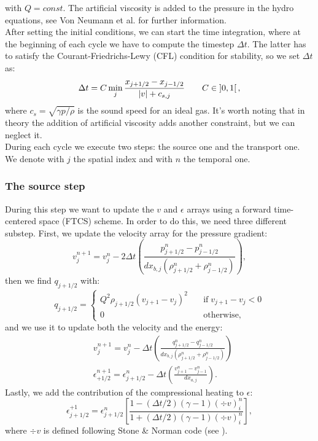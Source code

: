 \documentclass{article}
\begin{document}
with $Q=const$. The artificial viscosity is added to the pressure in the hydro equations, see Von Neumann et al.\cite{vonneuman} for further information.\\
After setting the initial conditions, we can start the time integration, where at the beginning of each cycle we have to compute the timestep $\Delta t$. The latter has to satisfy the Courant-Friedrichs-Lewy (CFL) condition for stability, so we set $\Delta t$ as:
\begin{equation}\label{timeeq}
	\Delta t=C\min_{j}{\frac{x_{j+1/2}-x_{j-1/2}}{\abs{v}+c_{s,j}}} \qquad C\in \left]0,1\right[,
\end{equation}
where $c_s=\sqrt{\gamma p/\rho}$ is the sound speed for an ideal gas. It's worth noting that in theory the addition of artificial viscosity adds another constraint, but we can neglect it. \\
During each cycle we execute two steps: the source one and the transport one. We denote with $j$ the spatial index and with $n$ the temporal one.
\subsubsection{The source step}
During this step we want to update the $v$ and $\epsilon$ arrays using a forward time-centered space (FTCS) scheme. In order to do this, we need three different substep. First, we update the velocity array for the pressure gradient:
\begin{equation}
	v_{j}^{n+1}=v_{j}^n-2\Delta t\left(\frac{p_{j+1/2}^n-p_{j-1/2}^n}{dx_{b,j}(\rho_{j+1/2}^n+\rho_{j-1/2}^n)}\right),
\end{equation}
then we find $q_{j+1/2}$ with:
\begin{equation}
	q_{j+1/2}=
	\begin{cases}
		Q^{2}\rho_{j+1/2}(v_{j+1}-v_j)^2 \quad &\text{if} \; v_{j+1}-v_j<0\\
		0 \quad &\text{otherwise},
	\end{cases}
\end{equation}
and we use it to update both the velocity and the energy:
\begin{align}
	&v_j^{n+1}=v_j^n-\Delta t\left(\frac{q_{j+1/2}^n-q_{j-1/2}^n}{dx_{b,j}(\rho_{j+1/2}^n+\rho_{j-1/2}^n)}\right)\\
	&\epsilon_{+1/2}^{n+1}=\epsilon_{j+1/2}^n-\Delta t\left(\frac{v_{j+1}^n-v_{j-1}^n}{dx_{a,j}}\right).
\end{align}
Lastly, we add the contribution of the compressional heating to $\epsilon$:
\begin{equation}
	\epsilon^{+1}_{j+1/2}=\epsilon^n_{j+1/2}\left[\frac{1-(\Delta t/2)(\gamma -1)(\div{v})_i^n}{1+(\Delta t/2)(\gamma -1)(\div{v})_i^n}\right],
\end{equation}
where $\div{v}$ is defined following Stone \& Norman code (see \cite{stone}).
\end{document}
